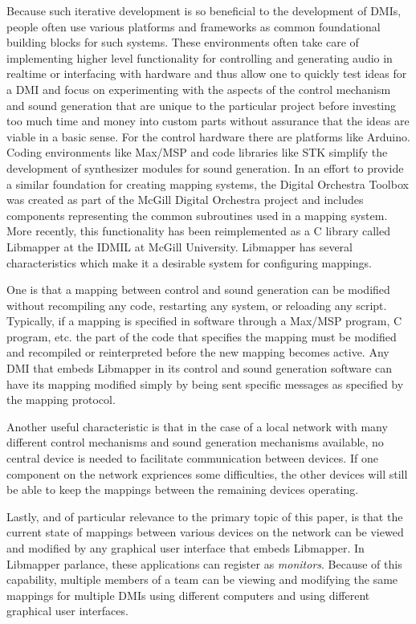Because such iterative development is so beneficial to the development of DMIs, people often use various platforms and frameworks as common foundational building blocks for such systems. These environments often take care of implementing higher level functionality for controlling and generating audio in realtime or interfacing with hardware and thus allow one to quickly test ideas for a DMI and focus on experimenting with the aspects of the control mechanism and sound generation that are unique to the particular project before investing too much time and money into custom parts without assurance that the ideas are viable in a basic sense. For the control hardware there are platforms like Arduino. Coding environments like Max/MSP and code libraries like STK simplify the development of synthesizer modules for sound generation. In an effort to provide a similar foundation for creating mapping systems, the Digital Orchestra Toolbox was created as part of the McGill Digital Orchestra project and includes components representing the common subroutines used in a mapping system. More recently, this functionality has been reimplemented as a C library called Libmapper at the IDMIL at McGill University. Libmapper has several characteristics which make it a desirable system for configuring mappings. 

One is that a mapping between control and sound generation can be modified without recompiling any code, restarting any system, or reloading any script. Typically, if a mapping is specified in software through a Max/MSP program, C program, etc. the part of the code that specifies the mapping must be modified and recompiled or reinterpreted before the new mapping becomes active. Any DMI that embeds Libmapper in its control and sound generation software can have its mapping modified simply by being sent specific messages as specified by the mapping protocol. 

Another useful characteristic is that in the case of a local network with many different control mechanisms and sound generation mechanisms available, no central device is needed to facilitate communication between devices. If one component on the network expriences some difficulties, the other devices will still be able to keep the mappings between the remaining devices operating.  

Lastly, and of particular relevance to the primary topic of this paper, is that the current state of mappings between various devices on the network can be viewed and modified by any graphical user interface that embeds Libmapper. In Libmapper parlance, these applications can register as \emph{monitors}. Because of this capability, multiple members of a team can be viewing and modifying the same mappings for multiple DMIs using different computers and using different graphical user interfaces.  

